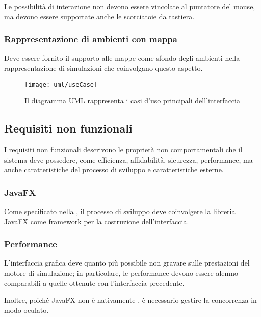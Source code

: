                 Le possibilità di interazione non devono essere vincolate al puntatore del mouse, ma devono essere supportate anche le scorciatoie da tastiera.

            \subsubsection{Rappresentazione di ambienti con mappa}\label{subsubsec:mappa}
                Deve essere fornito il supporto alle mappe come sfondo degli ambienti nella rappresentazione di simulazioni che coinvolgano questo aspetto.

            \begin{figure}[htbp]
                \centering
                \texttt{[image: uml/useCase]}
                \caption{Il diagramma UML rappresenta i casi d'uso principali dell'interfaccia}
                \label{fig:useCase}
            \end{figure}

        \subsection{Requisiti non funzionali}\label{subsec:nonFunzionali}
            I requisiti non funzionali descrivono le proprietà non comportamentali che il sistema deve possedere, come efficienza, affidabilità, sicurezza, performance, ma anche caratteristiche del processo di sviluppo e caratteristiche esterne.

            \subsubsection{JavaFX}\label{subsubsec:jfx}
                Come specificato nella , il processo di sviluppo deve coinvolgere la libreria JavaFX come framework per la costruzione dell'interfaccia.

            \subsubsection{Performance}\label{subsubsec:performance}
                L'interfaccia grafica deve quanto più possibile non gravare sulle prestazioni del motore di simulazione;
                in particolare, le performance devono essere alemno comparabili a quelle ottenute con l'interfaccia precedente.

                Inoltre, poiché JavaFX non è nativamente , è necessario gestire la concorrenza in modo oculato.


